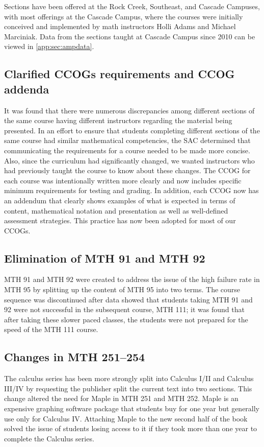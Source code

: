 Sections have been offered at the Rock Creek, Southeast, and Cascade Campuses,
with most offerings at the Cascade Campus, where the courses were initially conceived and implemented by math instructors Holli Adams and  Michael Marciniak. Data from the sections taught at
Cascade Campus since 2010 can be viewed in \vref{app:sec:ampdata}.
 
\subsection{Clarified CCOGs requirements and CCOG addenda}
It was found that there were numerous discrepancies among different sections of
the same course having different instructors regarding the material being
presented. In an effort to ensure that students completing different sections of
the same course had similar mathematical competencies, the SAC determined that
communicating the requirements for a course needed to be made more concise.
Also, since the curriculum had significantly changed, we wanted instructors who
had previously taught the course to know about these changes.  The CCOG for each
course was intentionally written more clearly and now includes specific minimum
requirements for testing and grading.  In addition, each CCOG now has an
addendum that clearly shows examples of what is expected in terms of content,
mathematical notation and presentation as well as well-defined assessment
strategies.  This practice has now been adopted for most of our CCOGs.
 
\subsection{Elimination of MTH 91 and MTH 92}
MTH 91 and MTH 92 were created to address the issue of the high failure rate in
MTH 95 by splitting up the content of MTH 95 into two terms.  The course
sequence was discontinued after data showed that students taking MTH 91 and 92
were not successful in the subsequent course, MTH 111; it was found that after
taking these slower paced classes, the students were not prepared for the speed
of the MTH 111 course.
 
\subsection{Changes in MTH 251--254}
The calculus series has been more strongly split into Calculus I/II and Calculus
III/IV by requesting the publisher split the current text into two sections.
This change altered the need for Maple in MTH 251 and MTH 252.  Maple is an
expensive graphing software package that students buy for one year but generally
use only for Calculus IV. Attaching Maple to the new second half of the book
solved the issue of students losing access to it if they took more than one year
to complete the Calculus series.

